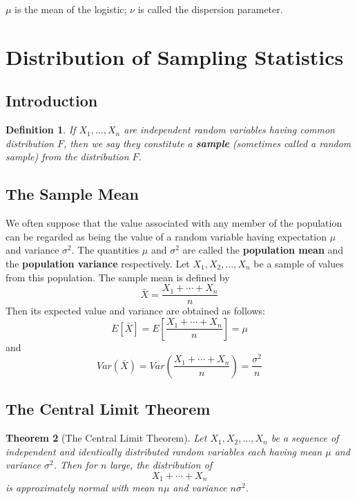 \documentclass[12pt]{article}
\newtheorem{theorem}{Theorem}
\newtheorem{definition}[theorem]{Definition}
\begin{document}
$\mu$ is the mean of the logistic; $\nu$ is called the dispersion parameter.

\section{Distribution of Sampling Statistics}

\subsection{Introduction}

\begin{definition}
  If $X_1,\dots,X_n$ are independent random variables having common distribution $F$, then we say they constitute a \textbf{sample} (sometimes called a \emph{random sample}) from the distribution $F$.
\end{definition}

\subsection{The Sample Mean}

We often suppose that the value associated with any member of the population can be regarded as being the value of a random variable having expectation $\mu$ and variance $\sigma^2$. The quantities $\mu$ and $\sigma^2$ are called the \textbf{population mean} and the \textbf{population variance} respectively. Let $X_1, X_2, \dots, X_n$ be a sample of values from this population. The sample mean is defined by
\begin{equation*}
  \bar{X} = \frac{X_1 + \cdots + X_n}{n}
\end{equation*}
Then its expected value and variance are obtained as follows:
\begin{equation*}
  E[\bar{X}] = E \left[ \frac{X_1 + \cdots + X_n}{n} \right] = \mu
\end{equation*}
and
\begin{equation*}
  Var(\bar{X}) = Var \left( \frac{X_1 + \cdots + X_n}{n} \right)
= \frac{\sigma^2}{n}
\end{equation*}

\subsection{The Central Limit Theorem}

\begin{theorem} [The Central Limit Theorem]
  Let $X_1, X_2,\dots,X_n$ be a sequence of independent and identically distributed random variables each having mean $\mu$ and variance $\sigma^2$. Then for $n$ large, the distribution of
  \begin{equation*}
    X_1 + \cdots + X_n
  \end{equation*}
  is approximately normal with mean $n\mu$ and variance $n\sigma^2$.
\end{theorem}
\end{document}
